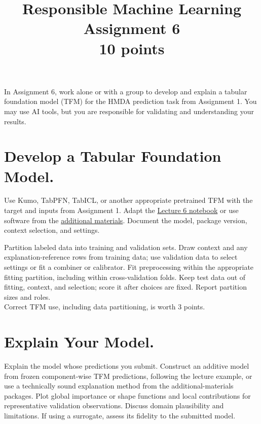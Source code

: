 \documentclass[fleqn]{article}
\title{Responsible Machine Learning\\\Large{Assignment 6}\\\Large{10 points}}
\begin{document}
\maketitle

\noindent In Assignment 6, work alone or with a group to develop and explain a tabular foundation model (TFM) for the HMDA prediction task from Assignment 1. You may use AI tools, but you are responsible for validating and understanding your results.

\setlength{\parskip}{3pt}

\section{Develop a Tabular Foundation Model.}

Use Kumo, TabPFN, TabICL, or another appropriate pretrained TFM with the target and inputs from Assignment 1. Adapt the \href{https://github.com/jphall663/GWU_rml/blob/master/lecture_6.ipynb}{Lecture 6 notebook} or use software from the \href{https://github.com/jphall663/GWU_rml/blob/master/additional_material/am6.md}{additional materials}. Document the model, package version, context selection, and settings.

Partition labeled data into training and validation sets. Draw context and any explanation-reference rows from training data; use validation data to select settings or fit a combiner or calibrator. Fit preprocessing within the appropriate fitting partition, including within cross-validation folds. Keep test data out of fitting, context, and selection; score it after choices are fixed. Report partition sizes and roles.\\

\noindent Correct TFM use, including data partitioning, is worth 3 points.

\section{Explain Your Model.}

Explain the model whose predictions you submit. Construct an additive model from frozen component-wise TFM predictions, following the lecture example, or use a technically sound explanation method from the additional-materials packages. Plot global importance or shape functions and local contributions for representative validation observations. Discuss domain plausibility and limitations. If using a surrogate, assess its fidelity to the submitted model.\\
\end{document}
